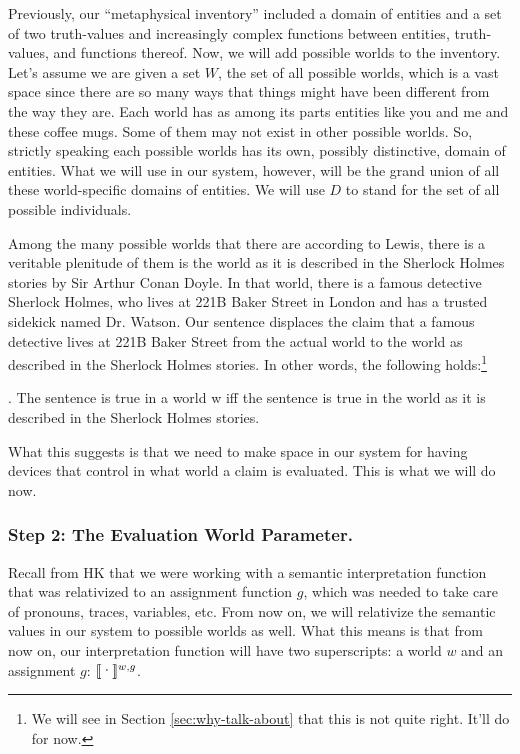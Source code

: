%
Previously, our ``metaphysical inventory'' included a domain of
entities and a set of two truth-values and increasingly complex
functions between entities, truth-values, and functions thereof. Now,
we will add possible worlds to the inventory. Let's assume we are
given a set $W$, the set of all possible worlds, which is a vast space
since there are so many ways that things might have been different
from the way they are. Each world has as among its parts entities like
you and me and these coffee mugs. Some of them may not exist in other
possible worlds. So, strictly speaking each possible worlds has its
own, possibly distinctive, domain of entities. What we will use in our
system, however, will be the grand union of all these world-specific
domains of entities. We will use $D$ to stand for the set of all
possible individuals.

Among the many possible worlds that there are \dash according to
Lewis, there is a veritable plenitude of them \dash is the world as it
is described in the Sherlock Holmes stories by Sir Arthur Conan Doyle.
In that world, there is a famous detective Sherlock Holmes, who lives
at 221B Baker Street in London and has a trusted sidekick named Dr.
Watson. Our sentence  displaces the claim that a
famous detective lives at 221B Baker Street from the actual world to
the world as described in the Sherlock Holmes stories. In other words,
the following holds:\footnote{We will see in Section
  \ref{sec:why-talk-about} that this is not quite right. It'll do for
  now.}

\ex. The sentence  is true in a world w iff the
sentence  is true
in the world as it is described in the Sherlock Holmes stories.

What this suggests is that we need to make space in our system for
having devices that control in what world a claim is evaluated. This
is what we will do now.

\subsubsection{Step 2: The Evaluation World Parameter.} \label{sec:eval-world-param}

Recall from H\amp K that we were working with a semantic
interpretation function that was relativized to an assignment function
$g$, which was needed to take care of pronouns, traces, variables,
etc. From now on, we will relativize the semantic values in our system
to possible worlds as well. What this means is that from now on, our
interpretation function will have two superscripts: a world $w$ and an
assignment $g$: $\sv{\mbox{\textperiodcentered}}^{w,g}$.

